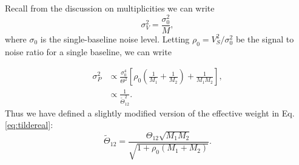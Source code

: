 \documentclass[twocolumn,apj,numberedappendix]{emulateapj}
\renewcommand\[{\begin{equation}}
\renewcommand\]{\end{equation}}
\begin{document}
Recall from the discussion on multiplicities we can write
\begin{equation}
\sigma_V^2=\frac{\sigma_0^2}{M},
\end{equation}
where $\sigma_0$ is the single-baseline noise level. Letting $\rho_0=V_S^2/\sigma_0^2$ be the signal to noise ratio for a single baseline, we can write

\begin{equation}
\begin{aligned}
\sigma_P^2 & \propto  \frac{\sigma_0^4}{\Theta^2} \left[ \rho_0 \left(\frac{1}{M_1}+\frac{1}{M_2} \right) + \frac{1}{M_1 M_2}\right], \\
&\propto \frac{1}{\widetilde{\Theta}_{12}^2}.
\end{aligned}
\end{equation}
Thus we have defined a slightly modified version of the effective weight in Eq.  \eqref{eq:tildereal}:
\begin{equation}
\widetilde{\Theta}_{12}=\frac{\Theta_{12}\sqrt{M_1M_{2}}}{\sqrt{1 + \rho_0 \left(M_1+M_{2} \right)}}.
\end{equation}









\end{document}
